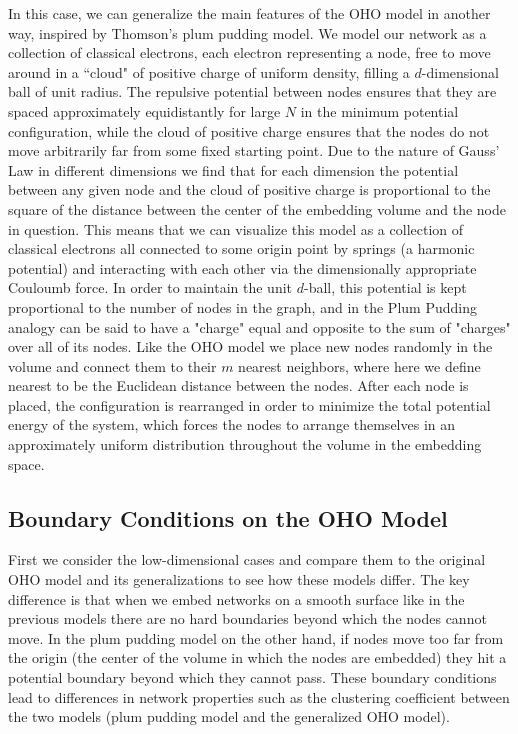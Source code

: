 \documentclass[aps,pre,reprint,superscriptaddress,amsmath,amssymb]{revtex4-1}
\begin{document}
In this case, we can generalize the main features of the OHO model in another way, inspired by Thomson's plum pudding model.
We model our network as a collection of classical electrons, each electron representing a node, free to move around in a ``cloud" of positive charge of uniform density, filling a $d$-dimensional ball of unit radius.
The repulsive potential between nodes ensures that they are spaced approximately equidistantly for large $N$ in the minimum potential configuration, while the cloud of positive charge ensures that the nodes do not move arbitrarily far from some fixed starting point.
Due to the nature of Gauss' Law in different dimensions we find that for each dimension the potential between any given node and the cloud of positive charge is proportional to the square of the distance between the center of the embedding volume and the node in question.
This means that we can visualize this model as a collection of classical electrons all connected to some origin point by springs (a harmonic potential) and interacting with each other via the dimensionally appropriate Couloumb force.  
In order to maintain the unit $d$-ball, this potential is kept proportional to the number of nodes in the graph, and in the Plum Pudding analogy can be said to have a "charge" equal and opposite to the sum of "charges" over all of its nodes.
Like the OHO model we place new nodes randomly in the volume and connect them to their $m$ nearest neighbors, where here we define nearest to be the Euclidean distance between the nodes.
After each node is placed, the configuration is rearranged in order to minimize the total potential energy of the system, which forces the nodes to arrange themselves in an approximately uniform distribution throughout the volume in the embedding space.



\subsection{Boundary Conditions on the OHO Model}
First we consider the low-dimensional cases and compare them to the original OHO model and its generalizations to see how these models differ.
The key difference is that when we embed networks on a smooth surface like in the previous models there are no hard boundaries beyond which the nodes cannot move.
In the plum pudding model on the other hand, if nodes move too far from the origin (the center of the volume in which the nodes are embedded) they hit a potential boundary beyond which they cannot pass.
These boundary conditions lead to differences in network properties such as the clustering coefficient between the two models (plum pudding model and the generalized OHO model).
\end{document}
